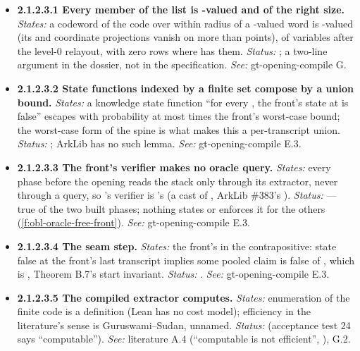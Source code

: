 \begin{itemize}[label={}, leftmargin=1.3em, itemindent=-1.3em, labelwidth=0pt, labelsep=0pt, itemsep=4pt, topsep=3pt]
\begin{itemize}[label={}, leftmargin=1.3em, itemindent=-1.3em, labelwidth=0pt, labelsep=0pt, itemsep=4pt, topsep=3pt]
\begin{itemize}[label={}, leftmargin=1.3em, itemindent=-1.3em, labelwidth=0pt, labelsep=0pt, itemsep=4pt, topsep=3pt]
\item {}\label{obl:node-2.1.2.3.1}\oblflag\textbf{2.1.2.3.1 Every member of the list is -valued and of the right size.} \emph{States:} a codeword of the code over  within radius  of a -valued word is -valued (its  and  coordinate projections vanish on more than  points), of  variables after the level-0 relayout, with zero rows where  has them. \emph{Status:}  ; a two-line argument in the dossier, not in the specification. \emph{See:} gt-opening-compile G.
\item {}\label{obl:node-2.1.2.3.2}\textbf{2.1.2.3.2 State functions indexed by a finite set compose by a union bound.} \emph{States:} a knowledge state function ``for every , the front's state at  is false'' escapes with probability at most  times the front's worst-case bound; the worst-case form of the spine is what makes this a per-transcript union. \emph{Status:} ; ArkLib has no such lemma. \emph{See:} gt-opening-compile E.3.
\item {}\label{obl:node-2.1.2.3.3}\oblflag\textbf{2.1.2.3.3 The front's verifier makes no oracle query.} \emph{States:} every phase before the opening reads the stack only through its extractor, never through a query, so 's verifier is 's (a cast of , ArkLib \#383's ). \emph{Status:}   — true of the two built phases; nothing states or enforces it for the others (\cref{f:obl-oracle-free-front}). \emph{See:} gt-opening-compile E.3.
\item {}\label{obl:node-2.1.2.3.4}\textbf{2.1.2.3.4 The seam step.} \emph{States:} the front's  in the contrapositive: state false at the front's last transcript implies some pooled claim is false of , which is , Theorem B.7's start invariant. \emph{Status:} . \emph{See:} gt-opening-compile E.3.
\item {}\label{obl:node-2.1.2.3.5}\textbf{2.1.2.3.5 The compiled extractor computes.} \emph{States:} enumeration of the finite code is a definition (Lean has no cost model); efficiency in the literature's sense is Guruswami–Sudan, unnamed. \emph{Status:}  (acceptance test 24 says ``computable''). \emph{See:} literature A.4 (``computable is not efficient'', ), G.2.

\end{itemize}
\end{itemize}
\end{itemize}
